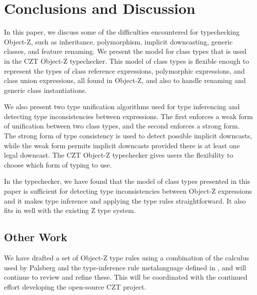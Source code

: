 \section{Conclusions and Discussion}

In this paper, we discuss some of the difficulties encountered for
typechecking Object-Z, such as inheritance, polymorphism, implicit
downcasting, generic classes, and feature renaming. We present the
model for class types that is used in the CZT Object-Z
typechecker. This model of class types is flexible enough to represent
the types of class reference expressions, polymorphic expressions, and
class union expressions, all found in Object-Z, and also to handle
renaming and generic class instantiations.

We also present two type unification algorithms used for type
inferencing and detecting type inconsistencies between
expressions. The first enforces a weak form of unification
between two class types, and the second enforces a strong
form. The strong form of type consistency is used to detect possible
implicit downcasts, while the weak form permits implicit downcasts
provided there is at least one legal downcast. The CZT Object-Z
typechecker gives users the flexibility to choose which form of typing
to use.

In the typechecker, we have found that the model of class types
presented in this paper is sufficient for detecting type
inconsistencies between Object-Z expressions and it makes type
inference and applying the type rules straightforward. It also fits in
well with the existing Z type system.

\subsection{Other Work}

We have drafted a set of Object-Z type rules using a combination of
the calculus used by Palsberg \cite{palsberg95} and the type-inference
rule metalanguage defined in \theStandard \cite{isoz}, and will
continue to review and refine these. This will be coordinated with the
continued effort developing the open-source CZT project.
